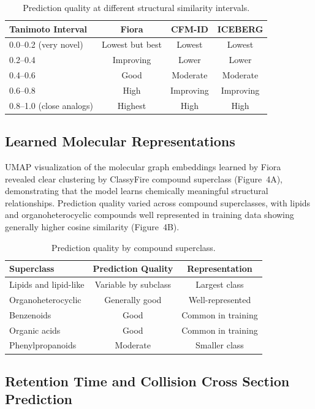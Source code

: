 \documentclass[11pt]{article}
\begin{document}
\begin{table}[H]
\centering
\caption{Prediction quality at different structural similarity intervals.}
\label{tab:tanimoto}
\begin{tabular}{lccc}
\toprule
Tanimoto Interval & Fiora & CFM-ID & ICEBERG \\
\midrule
0.0--0.2 (very novel) & Lowest but best & Lowest & Lowest \\
0.2--0.4 & Improving & Lower & Lower \\
0.4--0.6 & Good & Moderate & Moderate \\
0.6--0.8 & High & Improving & Improving \\
0.8--1.0 (close analogs) & Highest & High & High \\
\bottomrule
\end{tabular}
\end{table}

\subsection{Learned Molecular Representations}

UMAP visualization of the molecular graph embeddings learned by Fiora revealed clear clustering by ClassyFire compound superclass (Figure~4A), demonstrating that the model learns chemically meaningful structural relationships. Prediction quality varied across compound superclasses, with lipids and organoheterocyclic compounds well represented in training data showing generally higher cosine similarity (Figure~4B).

\begin{table}[H]
\centering
\caption{Prediction quality by compound superclass.}
\label{tab:superclass}
\begin{tabular}{lcc}
\toprule
Superclass & Prediction Quality & Representation \\
\midrule
Lipids and lipid-like & Variable by subclass & Largest class \\
Organoheterocyclic & Generally good & Well-represented \\
Benzenoids & Good & Common in training \\
Organic acids & Good & Common in training \\
Phenylpropanoids & Moderate & Smaller class \\
\bottomrule
\end{tabular}
\end{table}

\subsection{Retention Time and Collision Cross Section Prediction}
\end{document}
